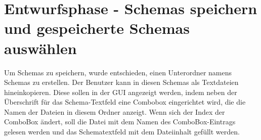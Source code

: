 \section{Entwurfsphase - Schemas speichern und gespeicherte Schemas auswählen} 
\label{sec:Entwurfsphase1}
Um Schemas zu speichern, wurde entschieden, einen Unterordner namens Schemas zu erstellen. Der Benutzer kann in diesen Schemas als Textdateien hineinkopieren.
Diese sollen in der GUI angezeigt werden, indem neben der Überschrift für das Schema-Textfeld eine Combobox eingerichtet wird, die die Namen der Dateien in diesem Ordner anzeigt. Wenn sich der Index der ComboBox ändert, soll die Datei mit dem Namen des ComboBox-Eintrags gelesen werden und das Schematextfeld mit dem Dateiinhalt gefüllt werden.

